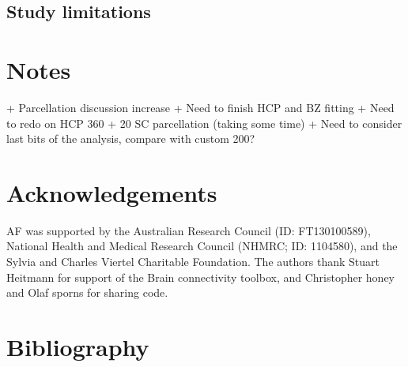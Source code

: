 \documentclass[oneside]{zHenriquesLab-StyleBioRxiv}
\begin{document}
\subsection*{Study limitations}

\section*{Notes}
+ Parcellation discussion increase
+ Need to finish HCP and BZ fitting
+ Need to redo on HCP 360 + 20 SC parcellation (taking some time)
+ Need to consider last bits of the analysis, compare with custom 200?

\section*{Acknowledgements}


\begin{acknowledgements}
AF was supported by the Australian Research Council (ID: FT130100589), National Health and Medical Research Council (NHMRC; ID: 1104580), and the Sylvia and Charles Viertel Charitable Foundation. The authors thank Stuart Heitmann for support of the Brain connectivity toolbox, and Christopher honey and Olaf sporns for sharing code. 
\end{acknowledgements}

\section*{Bibliography}



\onecolumn
\newpage





\end{document}
